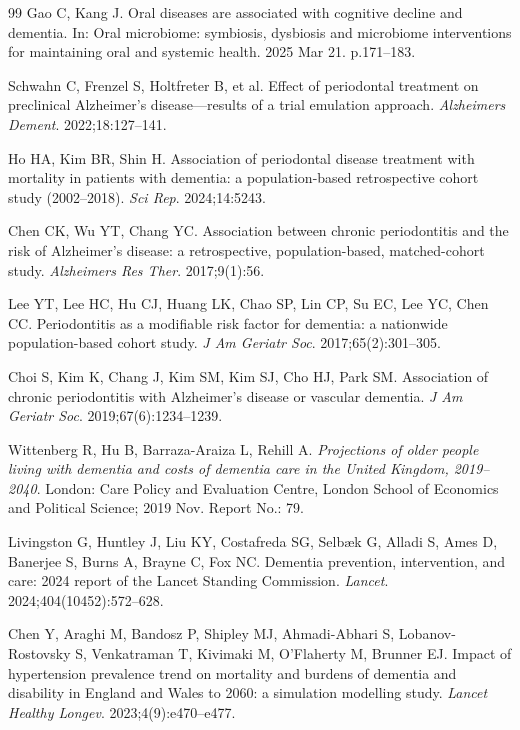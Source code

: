 \documentclass[11pt,a4paper]{article}
\begin{document}
\begin{thebibliography}{99}
 Gao C, Kang J. Oral diseases are associated with cognitive decline and dementia. In: Oral microbiome: symbiosis, dysbiosis and microbiome interventions for maintaining oral and systemic health. 2025 Mar 21. p.171--183.

 Schwahn C, Frenzel S, Holtfreter B, et al. Effect of periodontal treatment on preclinical Alzheimer's disease---results of a trial emulation approach. \textit{Alzheimers Dement}. 2022;18:127--141.

 Ho HA, Kim BR, Shin H. Association of periodontal disease treatment with mortality in patients with dementia: a population-based retrospective cohort study (2002--2018). \textit{Sci Rep}. 2024;14:5243.

 Chen CK, Wu YT, Chang YC. Association between chronic periodontitis and the risk of Alzheimer's disease: a retrospective, population-based, matched-cohort study. \textit{Alzheimers Res Ther}. 2017;9(1):56.

 Lee YT, Lee HC, Hu CJ, Huang LK, Chao SP, Lin CP, Su EC, Lee YC, Chen CC. Periodontitis as a modifiable risk factor for dementia: a nationwide population-based cohort study. \textit{J Am Geriatr Soc}. 2017;65(2):301--305.

 Choi S, Kim K, Chang J, Kim SM, Kim SJ, Cho HJ, Park SM. Association of chronic periodontitis with Alzheimer's disease or vascular dementia. \textit{J Am Geriatr Soc}. 2019;67(6):1234--1239.

 Wittenberg R, Hu B, Barraza-Araiza L, Rehill A. \textit{Projections of older people living with dementia and costs of dementia care in the United Kingdom, 2019--2040}. London: Care Policy and Evaluation Centre, London School of Economics and Political Science; 2019 Nov. Report No.: 79.

 Livingston G, Huntley J, Liu KY, Costafreda SG, Selbæk G, Alladi S, Ames D, Banerjee S, Burns A, Brayne C, Fox NC. Dementia prevention, intervention, and care: 2024 report of the Lancet Standing Commission. \textit{Lancet}. 2024;404(10452):572--628.

 Chen Y, Araghi M, Bandosz P, Shipley MJ, Ahmadi-Abhari S, Lobanov-Rostovsky S, Venkatraman T, Kivimaki M, O'Flaherty M, Brunner EJ. Impact of hypertension prevalence trend on mortality and burdens of dementia and disability in England and Wales to 2060: a simulation modelling study. \textit{Lancet Healthy Longev}. 2023;4(9):e470--e477.


\end{thebibliography}
\end{document}
